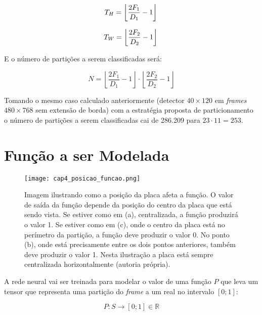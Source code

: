 \begin{equation}
	T_H=\left\lfloor \frac{2F_1}{D_1}-1 \right\rfloor \\
\end{equation}

\begin{equation}
	T_W=\left\lfloor \frac{2F_2}{D_2}-1 \right\rfloor \\
\end{equation}

E o número de partições a serem classificadas será:

\begin{equation}
	N=\left\lfloor \frac{2F_1}{D_1}-1 \right\rfloor \cdot
		\left\lfloor \frac{2F_2}{D_2}-1 \right\rfloor
\end{equation}

Tomando o mesmo caso calculado anteriormente (detector $40 \times 120$ em
\emph{frames} $480 \times 768$ sem extensão de borda) com a estratégia proposta
de particionamento o número de partições a serem classificadas cai de 286.209
para $23 \cdot 11=253$.

\section{Função a ser Modelada} \label{ses:funcao_a_modelar}

\begin{figure}[!htb]
	\centering
	\texttt{[image: cap4\_posicao\_funcao.png]}
	\caption[Imagem ilustrando como a posição da placa afeta a função]{
		Imagem ilustrando como a posição da placa afeta a função.
		O valor de saída da função depende da posição do centro da placa que
		está sendo vista. Se estiver como em (a), centralizada, a função
		produzirá o valor 1. Se estiver como em (c), onde o centro da placa
		está no perímetro da partição, a função deve produzir o valor 0. No
		ponto (b),  onde está precisamente entre os dois pontos anteriores,
		também deve produzir o valor 1. Nesta ilustração a placa está sempre
		centralizada horizontalmente (autoria própria).}
	\label{fig:cap4_posicao_funcao}
\end{figure}

A rede neural vai ser treinada para modelar o valor de uma função $P$ que
leva um tensor que representa uma partição do \emph{frame} a um real no
intervalo $[0;1]$:

\begin{equation}
	P:S \to [0;1] \in \mathbb{R} 
\end{equation}

